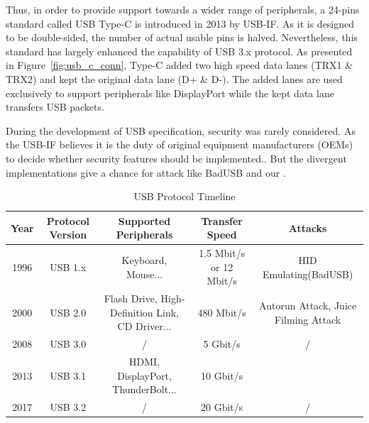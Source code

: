 Thus, in order to provide support towards a wider range of peripherals, a 24-pins standard called USB Type-C is introduced in 2013 by USB-IF. As it is designed to be double-sided, the number of actual usable pins is halved. Nevertheless, this standard has largely enhanced the capability of USB 3.x protocol. As presented in Figure~\ref{fig:usb_c_conn}, Type-C added two high speed data lanes (TRX1 \& TRX2) and kept the original data lane (D+ \& D-). The added lanes are used exclusively to support peripherals like DisplayPort while the kept data lane transfers USB packets.

During the development of USB specification, security was rarely considered.  As the USB-IF believes it is the duty of original equipment manufacturers (OEMs) to decide whether security features should be implemented.. But the divergent implementations give a chance for attack like BadUSB\cite{rubber} and our \tool.


\begin{table}
\begin{tabular}{|c|c|c|c|c|}
	\hline
	Year & Protocol Version & Supported Peripherals & Transfer Speed & Attacks \\
	\hline
	1996 & USB 1.x & Keyboard, Mouse... & 1.5 Mbit/s or 12 Mbit/s & HID Emulating(BadUSB) \\
	\hline
	2000 & USB 2.0 & Flash Drive, High-Definition Link, CD Driver... & 480 Mbit/s & Autorun Attack, Juice Filming Attack \\
	\hline
	2008 & USB 3.0 & / & 5 Gbit/s & / \\
	\hline
	2013 & USB 3.1 & HDMI, DisplayPort, ThunderBolt... & 10 Gbit/s & \tool \\
	\hline
	2017 & USB 3.2 & / & 20 Gbit/s & / \\
	\hline
\end{tabular}
	\linebreak
\caption{USB Protocol Timeline}
\label{table:usb_timeline}
\end{table}
